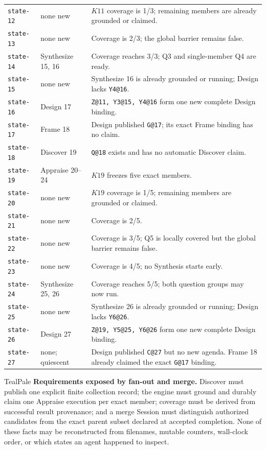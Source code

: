 \documentclass[11pt]{article}
\begin{document}
{\begin{longtable}{@{}L{0.72in}L{1.62in}L{3.73in}@{}}
\texttt{state-12} & none new & \(K11\) coverage is 1/3; remaining members are already grounded or claimed. \\
\texttt{state-13} & none new & Coverage is 2/3; the global barrier remains false. \\
\texttt{state-14} & Synthesize 15, 16 & Coverage reaches 3/3; Q3 and single-member Q4 are ready. \\
\texttt{state-15} & none new & Synthesize 16 is already grounded or running; Design lacks \texttt{Y4@16}. \\
\texttt{state-16} & Design 17 & \texttt{Z@11, Y3@15, Y4@16} form one new complete Design binding. \\
\texttt{state-17} & Frame 18 & Design published \texttt{G@17}; its exact Frame binding has no claim. \\
\texttt{state-18} & Discover 19 & \texttt{Q@18} exists and has no automatic Discover claim. \\
\texttt{state-19} & Appraise 20--24 & \(K19\) freezes five exact members. \\
\texttt{state-20} & none new & \(K19\) coverage is 1/5; remaining members are grounded or claimed. \\
\texttt{state-21} & none new & Coverage is 2/5. \\
\texttt{state-22} & none new & Coverage is 3/5; Q5 is locally covered but the global barrier remains false. \\
\texttt{state-23} & none new & Coverage is 4/5; no Synthesis starts early. \\
\texttt{state-24} & Synthesize 25, 26 & Coverage reaches 5/5; both question groups may now run. \\
\texttt{state-25} & none new & Synthesize 26 is already grounded or running; Design lacks \texttt{Y6@26}. \\
\texttt{state-26} & Design 27 & \texttt{Z@19, Y5@25, Y6@26} form one new complete Design binding. \\
\texttt{state-27} & none; quiescent & Design published \texttt{C@27} but no new agenda. Frame 18 already claimed the exact \texttt{G@17} binding. \\
\bottomrule
\end{longtable}
}

\begin{decisionbox}{TealPale}
\textbf{Requirements exposed by fan-out and merge.} Discover must publish one
explicit finite collection record; the engine must ground and durably claim one
Appraise execution per exact member; coverage must be derived from successful
result provenance; and a merge Session must distinguish authorized candidates
from the exact parent subset declared at accepted completion. None of these
facts may be reconstructed from filenames, mutable counters, wall-clock order,
or which states an agent happened to inspect.
\end{decisionbox}
\end{document}
